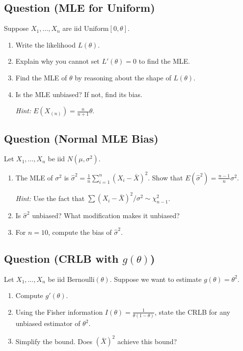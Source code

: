 \documentclass[11pt]{article}
\newcounter{qnum}
\newcommand{\question}[1]{\stepcounter{qnum}\subsection*{Question \theqnum \quad (#1)}}
\begin{document}
\vspace{2.5in}

\question{MLE for Uniform}
Suppose $X_1, \ldots, X_n$ are iid $\text{Uniform}[0, \theta]$.

\begin{enumerate}[label=(\alph*)]
\item Write the likelihood $L(\theta)$.
\item Explain why you cannot set $L'(\theta) = 0$ to find the MLE.
\item Find the MLE of $\theta$ by reasoning about the shape of $L(\theta)$.
\item Is the MLE unbiased? If not, find its bias.

\textit{Hint:} $E(X_{(n)}) = \frac{n}{n+1}\theta$.
\end{enumerate}

\vspace{3in}

\question{Normal MLE Bias}
Let $X_1, \ldots, X_n$ be iid $N(\mu, \sigma^2)$.

\begin{enumerate}[label=(\alph*)]
\item The MLE of $\sigma^2$ is $\hat\sigma^2 = \frac{1}{n}\sum_{i=1}^n(X_i - \bar X)^2$. Show that $E(\hat\sigma^2) = \frac{n-1}{n}\sigma^2$.

\textit{Hint:} Use the fact that $\sum(X_i - \bar X)^2/\sigma^2 \sim \chi^2_{n-1}$.

\item Is $\hat\sigma^2$ unbiased? What modification makes it unbiased?
\item For $n = 10$, compute the bias of $\hat\sigma^2$.
\end{enumerate}

\vspace{3in}

\question{CRLB with $g(\theta)$}
Let $X_1, \ldots, X_n$ be iid $\text{Bernoulli}(\theta)$. Suppose we want to estimate $g(\theta) = \theta^2$.

\begin{enumerate}[label=(\alph*)]
\item Compute $g'(\theta)$.
\item Using the Fisher information $I(\theta) = \frac{1}{\theta(1-\theta)}$, state the CRLB for any unbiased estimator of $\theta^2$.
\item Simplify the bound. Does $(\bar X)^2$ achieve this bound?
\end{enumerate}
\end{document}
